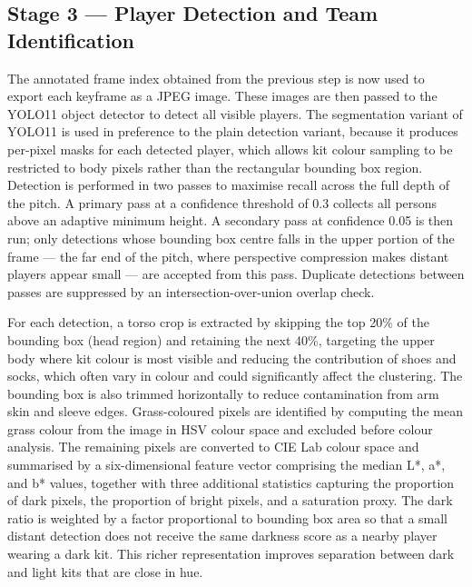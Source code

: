 \subsection{Stage 3 — Player Detection and Team Identification}%
\label{sec:design_detection}

The annotated frame index obtained from the previous step is now used to export each keyframe as a JPEG image. These images are then passed to the YOLO11 object detector to detect all visible players. The segmentation variant of YOLO11 is used in preference to the plain detection variant, because it produces per-pixel masks for each detected player, which allows kit colour sampling to be restricted to body pixels rather than the rectangular bounding box region. Detection is performed in two passes to maximise recall across the full depth of the pitch. A primary pass at a confidence threshold of 0.3 collects all persons above an adaptive minimum height. A secondary pass at confidence 0.05 is then run; only detections whose bounding box centre falls in the upper portion of the frame --- the far end of the pitch, where perspective compression makes distant players appear small --- are accepted from this pass. Duplicate detections between passes are suppressed by an intersection-over-union overlap check.

For each detection, a torso crop is extracted by skipping the top 20\% of the bounding box (head region) and retaining the next 40\%, targeting the upper body where kit colour is most visible and reducing the contribution of shoes and socks, which often vary in colour and could significantly affect the clustering. The bounding box is also trimmed horizontally to reduce contamination from arm skin and sleeve edges. Grass-coloured pixels are identified by computing the mean grass colour from the image in HSV colour space and excluded before colour analysis. The remaining pixels are converted to CIE Lab colour space and summarised by a six-dimensional feature vector comprising the median L*, a*, and b* values, together with three additional statistics capturing the proportion of dark pixels, the proportion of bright pixels, and a saturation proxy. The dark ratio is weighted by a factor proportional to bounding box area so that a small distant detection does not receive the same darkness score as a nearby player wearing a dark kit. This richer representation improves separation between dark and light kits that are close in hue.


